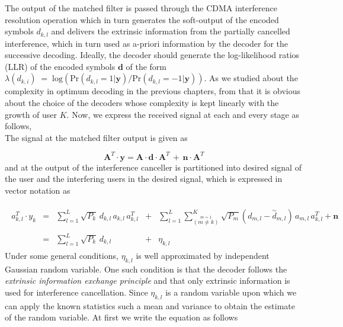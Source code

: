 The output of the matched filter is passed through the CDMA interference resolution operation which in turn generates the soft-output of the encoded symbols $d_{k,l}$ and delivers the extrinsic information from the partially cancelled interference, which in turn used as a-priori information by the decoder for the successive decoding. Ideally, the decoder should generate the log-likelihood ratios (LLR) of the encoded symbols $\mathrm{\mathbf{d}}$ of the form $\lambda(d_{k,i})\;=\;\mathrm{log}(\mathrm{Pr}(d_{k,l}=1\vert \mathrm{\mathbf{y}})/\mathrm{Pr}(d_{k,l}=-1\vert \mathrm{\mathbf{y}}))$. As we studied about the complexity in optimum decoding in the previous chapters, from that it is obvious about the choice of the decoders whose complexity is kept linearly with the growth of user $K$. Now, we express the received signal at each and every stage as follows,\\

The signal at the matched filter output is given as

\begin{equation}
\mathrm{\mathbf{A}}^T\cdot \mathrm{\mathbf{y}}=\mathrm{\mathbf{A}}\cdot\mathrm{\mathbf{d}}\cdot \mathrm{\mathbf{A}}^T\,+\,\mathrm{\mathbf{n}}\cdot \mathrm{\mathbf{A}}^T
\end{equation}
and at the output of the interference canceller is partitioned into desired signal of the user and the interfering users in the desired signal, which is expressed in vector notation as

\small
\begin{eqnarray}
\begin{array}{llllll}
a_{k,l}^T\cdot y_{k}&=&\sum\limits_{l=1}^L\sqrt{P_k}\,d_{k,l}\,a_{k,l}\,a_{k,l}^T&+&\sum\limits_{l=1}^{L}\sum\limits_{\stackrel{m=1}{(m\neq k)}}^{K}\sqrt{P_m}(d_{m,l}-\stackrel{\sim}{d}_{m,l})\,a_{m,l}\,a_{k,l}^T+\mathrm{\mathbf{n}} \\ \\
&=&\sum\limits_{l=1}^L\sqrt{P_k}\,d_{k,l}&+&\eta_{k,l}
\end{array} 
\end{eqnarray}
\normalsize
Under some general conditions, $\eta_{k,l}$ is well approximated by independent Gaussian random variable. One such condition is that the decoder follows the \textit{extrinsic information exchange principle} and that only extrinsic information is used for interference cancellation. Since $\eta_{k,l}$ is a random variable upon which we can apply the known statistics such a mean and variance to obtain the estimate of the random variable. At first we write the equation as follows

